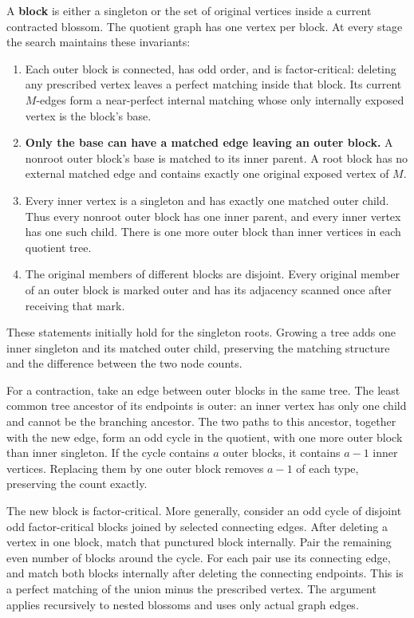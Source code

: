 A \textbf{block} is either a singleton or the set of original vertices inside a current contracted blossom. The quotient graph has one vertex per block. At every stage the search maintains these invariants:

\begin{enumerate}
\def\labelenumi{\arabic{enumi}.}
\tightlist
\item
  Each outer block is connected, has odd order, and is factor-critical: deleting any prescribed vertex leaves a perfect matching inside that block. Its current \(M\)-edges form a near-perfect internal matching whose only internally exposed vertex is the block's base.
\item
  \textbf{Only the base can have a matched edge leaving an outer block.} A nonroot outer block's base is matched to its inner parent. A root block has no external matched edge and contains exactly one original exposed vertex of \(M\).
\item
  Every inner vertex is a singleton and has exactly one matched outer child. Thus every nonroot outer block has one inner parent, and every inner vertex has one such child. There is one more outer block than inner vertices in each quotient tree.
\item
  The original members of different blocks are disjoint. Every original member of an outer block is marked outer and has its adjacency scanned once after receiving that mark.
\end{enumerate}

These statements initially hold for the singleton roots. Growing a tree adds one inner singleton and its matched outer child, preserving the matching structure and the difference between the two node counts.

For a contraction, take an edge between outer blocks in the same tree. The least common tree ancestor of its endpoints is outer: an inner vertex has only one child and cannot be the branching ancestor. The two paths to this ancestor, together with the new edge, form an odd cycle in the quotient, with one more outer block than inner singleton. If the cycle contains \(a\) outer blocks, it contains \(a-1\) inner vertices. Replacing them by one outer block removes \(a-1\) of each type, preserving the count exactly.

The new block is factor-critical. More generally, consider an odd cycle of disjoint odd factor-critical blocks joined by selected connecting edges. After deleting a vertex in one block, match that punctured block internally. Pair the remaining even number of blocks around the cycle. For each pair use its connecting edge, and match both blocks internally after deleting the connecting endpoints. This is a perfect matching of the union minus the prescribed vertex. The argument applies recursively to nested blossoms and uses only actual graph edges.

